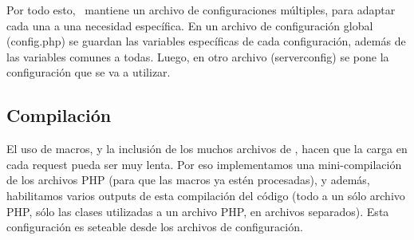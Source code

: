 Por todo esto, \PWB \ mantiene un archivo de configuraciones múltiples, para adaptar cada una a una necesidad específica. En un archivo de configuración global (config.php) se guardan las variables específicas de cada configuración, además de las variables comunes a todas. Luego, en otro archivo (serverconfig) se pone la configuración que se va a utilizar.

\subsection{Compilación}

El uso de macros, y la inclusión de los muchos archivos de \PWB, hacen que la carga en cada request pueda ser muy lenta. Por eso implementamos una mini-compilación de los archivos PHP (para que las macros ya estén procesadas), y además, habilitamos varios outputs de esta compilación del código (todo a un sólo archivo PHP, sólo las clases utilizadas a un archivo PHP, en archivos separados). Esta configuración es seteable desde los archivos de configuración.